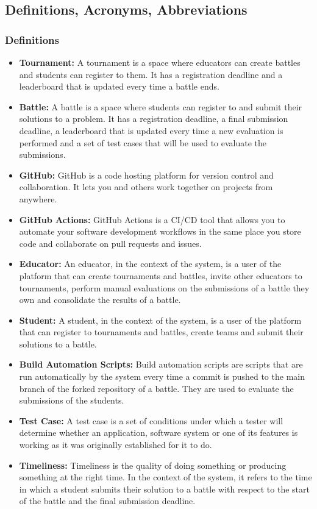 \documentclass{article}
\begin{document}
\newpage

\subsection{Definitions, Acronyms, Abbreviations}

\subsubsection{Definitions}
 
\begin{itemize}
    \item \textbf{Tournament:} A tournament is a space where educators can create battles and students can register to them. It has a registration deadline and a leaderboard that is updated every time a battle ends.
    \item \textbf{Battle:} A battle is a space where students can register to and submit their solutions to a problem. It has a registration deadline, a final submission deadline, a leaderboard that is updated every time a new evaluation is performed and a set of test cases that will be used to evaluate the submissions.
    \item \textbf{GitHub:} GitHub is a code hosting platform for version control and collaboration. It lets you and others work together on projects from anywhere.
    \item \textbf{GitHub Actions:} GitHub Actions is a CI/CD tool that allows you to automate your software development workflows in the same place you store code and collaborate on pull requests and issues.
    \item \textbf{Educator:} An educator, in the context of the system, is a user of the platform that can create tournaments and battles, invite other educators to tournaments, perform manual evaluations on the submissions of a battle they own and consolidate the results of a battle.
    \item \textbf{Student:} A student, in the context of the system, is a user of the platform that can register to tournaments and battles, create teams and submit their solutions to a battle.
    \item \textbf{Build Automation Scripts:} Build automation scripts are scripts that are run automatically by the system every time a commit is pushed to the main branch of the forked repository of a battle. They are used to evaluate the submissions of the students.
    \item \textbf{Test Case:} A test case is a set of conditions under which a tester will determine whether an application, software system or one of its features is working as it was originally established for it to do.
    \item \textbf{Timeliness:} Timeliness is the quality of doing something or producing something at the right time. In the context of the system, it refers to the time in which a student submits their solution to a battle with respect to the start of the battle and the final submission deadline.
\end{itemize}
\end{document}
